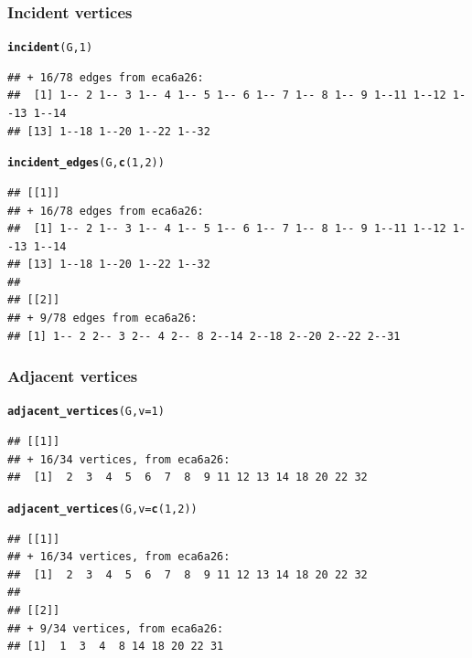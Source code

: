 \documentclass[aspectratio=169]{beamer}\usepackage[]{graphicx}\usepackage[]{xcolor}
\makeatletter
\newcommand{\hlnum}[1]{\textcolor[rgb]{0.686,0.059,0.569}{#1}}%
\newcommand{\hldef}[1]{\textcolor[rgb]{0.345,0.345,0.345}{#1}}%
\newcommand{\hlkwc}[1]{\textcolor[rgb]{0.333,0.667,0.333}{#1}}%
\newcommand{\hlkwd}[1]{\textcolor[rgb]{0.737,0.353,0.396}{\textbf{#1}}}%
\newenvironment{kframe}{%
 \def\at@end@of@kframe{}%
 \ifinner\ifhmode%
  \def\at@end@of@kframe{\end{minipage}}%
  \begin{minipage}{\columnwidth}%
 \fi\fi%
 \def\FrameCommand##1{\hskip\@totalleftmargin \hskip-\fboxsep
 \colorbox{shadecolor}{##1}\hskip-\fboxsep
     \hskip-\linewidth \hskip-\@totalleftmargin \hskip\columnwidth}%
 \MakeFramed {\advance\hsize-\width
   \@totalleftmargin\z@ \linewidth\hsize
   \@setminipage}}%
 {\par\unskip\endMakeFramed%
 \at@end@of@kframe}
\newenvironment{knitrout}{}{} %
\makeatother
\begin{document}
\begin{frame}[fragile]\frametitle{Incident vertices}
\begin{knitrout}
\color{fgcolor}\begin{kframe}
\begin{alltt}
\hlkwd{incident}\hldef{(G,} \hlnum{1}\hldef{)}
\end{alltt}
\begin{verbatim}
## + 16/78 edges from eca6a26:
##  [1] 1-- 2 1-- 3 1-- 4 1-- 5 1-- 6 1-- 7 1-- 8 1-- 9 1--11 1--12 1--13 1--14
## [13] 1--18 1--20 1--22 1--32
\end{verbatim}
\begin{alltt}
\hlkwd{incident_edges}\hldef{(G,} \hlkwd{c}\hldef{(}\hlnum{1}\hldef{,} \hlnum{2}\hldef{))}
\end{alltt}
\begin{verbatim}
## [[1]]
## + 16/78 edges from eca6a26:
##  [1] 1-- 2 1-- 3 1-- 4 1-- 5 1-- 6 1-- 7 1-- 8 1-- 9 1--11 1--12 1--13 1--14
## [13] 1--18 1--20 1--22 1--32
## 
## [[2]]
## + 9/78 edges from eca6a26:
## [1] 1-- 2 2-- 3 2-- 4 2-- 8 2--14 2--18 2--20 2--22 2--31
\end{verbatim}
\end{kframe}
\end{knitrout}
\end{frame}

\begin{frame}[fragile]\frametitle{Adjacent vertices}
\begin{knitrout}
\color{fgcolor}\begin{kframe}
\begin{alltt}
\hlkwd{adjacent_vertices}\hldef{(G,} \hlkwc{v} \hldef{=} \hlnum{1}\hldef{)}
\end{alltt}
\begin{verbatim}
## [[1]]
## + 16/34 vertices, from eca6a26:
##  [1]  2  3  4  5  6  7  8  9 11 12 13 14 18 20 22 32
\end{verbatim}
\begin{alltt}
\hlkwd{adjacent_vertices}\hldef{(G,} \hlkwc{v} \hldef{=} \hlkwd{c}\hldef{(}\hlnum{1}\hldef{,} \hlnum{2}\hldef{))}
\end{alltt}
\begin{verbatim}
## [[1]]
## + 16/34 vertices, from eca6a26:
##  [1]  2  3  4  5  6  7  8  9 11 12 13 14 18 20 22 32
## 
## [[2]]
## + 9/34 vertices, from eca6a26:
## [1]  1  3  4  8 14 18 20 22 31
\end{verbatim}
\end{kframe}
\end{knitrout}
\end{frame}
\end{document}
